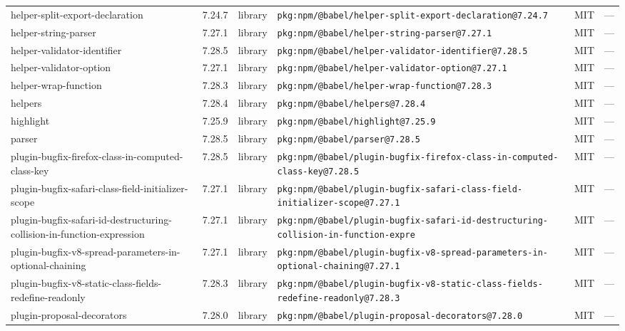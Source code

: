\documentclass[11pt,a4paper]{article}
\begin{document}
\begin{longtable}{|p{4cm}|p{2cm}|p{1.6cm}|p{5cm}|p{1.5cm}|p{3.5cm}|}
\raggedright helper-split-export-declaration & 7.24.7 & library & \small\texttt{pkg:npm/@babel/helper-split-export-declaration@7.24.7} & MIT & \small — \\
\raggedright helper-string-parser & 7.27.1 & library & \small\texttt{pkg:npm/@babel/helper-string-parser@7.27.1} & MIT & \small — \\
\raggedright helper-validator-identifier & 7.28.5 & library & \small\texttt{pkg:npm/@babel/helper-validator-identifier@7.28.5} & MIT & \small — \\
\raggedright helper-validator-option & 7.27.1 & library & \small\texttt{pkg:npm/@babel/helper-validator-option@7.27.1} & MIT & \small — \\
\raggedright helper-wrap-function & 7.28.3 & library & \small\texttt{pkg:npm/@babel/helper-wrap-function@7.28.3} & MIT & \small — \\
\raggedright helpers & 7.28.4 & library & \small\texttt{pkg:npm/@babel/helpers@7.28.4} & MIT & \small — \\
\raggedright highlight & 7.25.9 & library & \small\texttt{pkg:npm/@babel/highlight@7.25.9} & MIT & \small — \\
\raggedright parser & 7.28.5 & library & \small\texttt{pkg:npm/@babel/parser@7.28.5} & MIT & \small — \\
\raggedright plugin-bugfix-firefox-class-in-computed-class-key & 7.28.5 & library & \small\texttt{pkg:npm/@babel/plugin-bugfix-firefox-class-in-computed-class-key@7.28.5} & MIT & \small — \\
\raggedright plugin-bugfix-safari-class-field-initializer-scope & 7.27.1 & library & \small\texttt{pkg:npm/@babel/plugin-bugfix-safari-class-field-initializer-scope@7.27.1} & MIT & \small — \\
\raggedright plugin-bugfix-safari-id-destructuring-collision-in-function-expression & 7.27.1 & library & \small\texttt{pkg:npm/@babel/plugin-bugfix-safari-id-destructuring-collision-in-function-expre} & MIT & \small — \\
\raggedright plugin-bugfix-v8-spread-parameters-in-optional-chaining & 7.27.1 & library & \small\texttt{pkg:npm/@babel/plugin-bugfix-v8-spread-parameters-in-optional-chaining@7.27.1} & MIT & \small — \\
\raggedright plugin-bugfix-v8-static-class-fields-redefine-readonly & 7.28.3 & library & \small\texttt{pkg:npm/@babel/plugin-bugfix-v8-static-class-fields-redefine-readonly@7.28.3} & MIT & \small — \\
\raggedright plugin-proposal-decorators & 7.28.0 & library & \small\texttt{pkg:npm/@babel/plugin-proposal-decorators@7.28.0} & MIT & \small — \\

\end{longtable}
\end{document}
